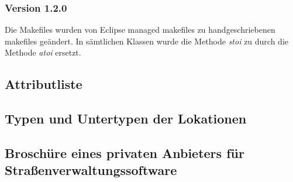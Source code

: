\documentclass[12pt, a4paper, ngerman]{article}
\begin{document}
\subsubsection{Version 1.2.0}
Die Makefiles wurden von Eclipse managed makefiles zu handgeschriebenen makefiles geändert. In sämtlichen Klassen wurde die Methode \textit{stoi} zu durch die Methode \textit{atoi} ersetzt.

\subsection{Attributliste \label{bundAttributListe}}


\subsection{Typen und Untertypen der Lokationen \label{bundFeinDoku}}


\subsection{Broschüre eines privaten Anbieters für Straßenverwaltungssoftware \label{bundGDD}}

\end{document}
